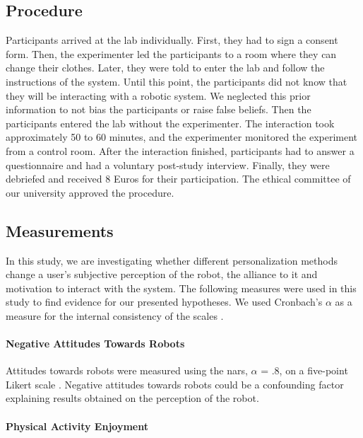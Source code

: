 \documentclass[twocolumn]{svjour3}          %
\begin{document}
\hypertarget{procedure}{%
\subsection{Procedure}\label{procedure}}

Participants arrived at the lab individually. First, they had to sign a
consent form. Then, the experimenter led the participants to a room
where they can change their clothes. Later, they were told to enter the
lab and follow the instructions of the system. Until this point, the
participants did not know that they will be interacting with a robotic
system. We neglected this prior information to not bias the participants
or raise false beliefs. Then the participants entered the lab without
the experimenter. The interaction took approximately 50 to 60 minutes,
and the experimenter monitored the experiment from a control room. After
the interaction finished, participants had to answer a questionnaire and
had a voluntary post-study interview. Finally, they were debriefed and received 8 Euros
for their participation. The ethical committee of our university
approved the procedure.

\hypertarget{measurements}{%
\subsection{Measurements}\label{measurements}}

In this study, we are investigating whether different personalization
methods change a user's subjective perception of the robot, the alliance
to it and motivation to interact with the system. The following measures
were used in this study to find evidence for our presented hypotheses.
We used Cronbach's \(\alpha\) as a measure for the internal consistency
of the scales \autocite{cronbach1951coefficient}.

\hypertarget{negative-attitudes-towards-robots}{%
\paragraph{Negative Attitudes Towards
Robots}\label{negative-attitudes-towards-robots}}

Attitudes towards robots were measured using the \gls{nars}, \(\alpha\) = .8, on a five-point
Likert scale \autocite{nomura2006experimental}. Negative attitudes
towards robots could be a confounding factor explaining results obtained
on the perception of the robot.

\hypertarget{physical-activity-enjoyment}{%
\paragraph{Physical Activity
Enjoyment}\label{physical-activity-enjoyment}}
\end{document}
